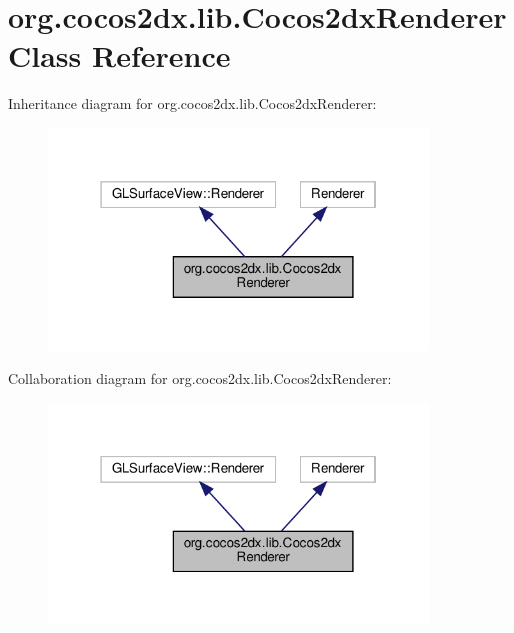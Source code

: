 \hypertarget{classorg_1_1cocos2dx_1_1lib_1_1Cocos2dxRenderer}{}\section{org.\+cocos2dx.\+lib.\+Cocos2dx\+Renderer Class Reference}
\label{classorg_1_1cocos2dx_1_1lib_1_1Cocos2dxRenderer}


Inheritance diagram for org.\+cocos2dx.\+lib.\+Cocos2dx\+Renderer\+:
\nopagebreak
\begin{figure}[H]
\begin{center}
\leavevmode
\includegraphics[width=286pt]{classorg_1_1cocos2dx_1_1lib_1_1Cocos2dxRenderer__inherit__graph}
\end{center}
\end{figure}


Collaboration diagram for org.\+cocos2dx.\+lib.\+Cocos2dx\+Renderer\+:
\nopagebreak
\begin{figure}[H]
\begin{center}
\leavevmode
\includegraphics[width=286pt]{classorg_1_1cocos2dx_1_1lib_1_1Cocos2dxRenderer__coll__graph}
\end{center}
\end{figure}
